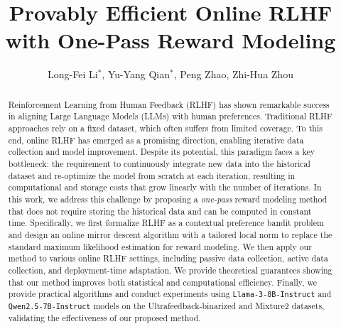 

\title{Provably Efficient Online RLHF with One-Pass Reward Modeling}

\author{Long-Fei Li$^*$, Yu-Yang Qian$^*$, Peng Zhao, Zhi-Hua Zhou}
\date{}

\renewcommand{\REPLACED}{\fnsymbol{footnote}}
\renewcommand{\REPLACED}{\arabic{footnote}}
\setcounter{footnote}{0}

\maketitle


\begin{abstract}
  Reinforcement Learning from Human Feedback (RLHF) has shown remarkable success in aligning Large Language Models (LLMs) with human preferences. Traditional RLHF approaches rely on a fixed dataset, which often suffers from limited coverage. To this end, online RLHF has emerged as a promising direction, enabling iterative data collection and model improvement. Despite its potential, this paradigm faces a key bottleneck: the requirement to continuously integrate new data into the historical dataset and re-optimize the model from scratch at each iteration, resulting in computational and storage costs that grow linearly with the number of iterations. In this work, we address this challenge by proposing a \emph{one-pass} reward modeling method that does not require storing the historical data and can be computed in constant time. Specifically, we first formalize RLHF as a contextual preference bandit problem and design an online mirror descent algorithm with a tailored local norm to replace the standard maximum likelihood estimation for reward modeling. We then apply our method to various online RLHF settings, including passive data collection, active data collection, and deployment-time adaptation. We provide theoretical guarantees showing that our method improves both statistical and computational efficiency. Finally, we provide practical algorithms and conduct experiments using \texttt{Llama-3-8B-Instruct} and \texttt{Qwen2.5-7B-Instruct} models on the \mbox{Ultrafeedback-binarized} and Mixture2 datasets, validating the effectiveness of our proposed method.
\end{abstract}


